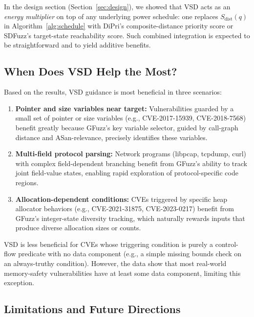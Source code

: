 \documentclass[preprint,12pt,3p]{elsarticle}
\begin{document}
In the design section (Section~\ref{sec:design}), we showed that VSD acts
as an \emph{energy multiplier} on top of any underlying power schedule:
one replaces $S_{\text{dist}}(q)$ in Algorithm~\ref{alg:schedule} with
DiPri's composite-distance priority score or SDFuzz's target-state
reachability score.  Such combined integration is expected to be
straightforward and to yield additive benefits.

\subsection{When Does VSD Help the Most?}

Based on the results, VSD guidance is most beneficial in three scenarios:

\begin{enumerate}
  \item \textbf{Pointer and size variables near target:} Vulnerabilities
    guarded by a small set of pointer or size variables (e.g.,
    CVE-2017-15939, CVE-2018-7568) benefit greatly because GFuzz's key
    variable selector, guided by call-graph distance and ASan-relevance,
    precisely identifies these variables.

  \item \textbf{Multi-field protocol parsing:} Network programs (libpcap,
    tcpdump, curl) with complex field-dependent branching benefit from
    GFuzz's ability to track joint field-value states, enabling rapid
    exploration of protocol-specific code regions.

  \item \textbf{Allocation-dependent conditions:} CVEs triggered by
    specific heap allocator behaviors (e.g., CVE-2021-31875, CVE-2023-0217)
    benefit from GFuzz's integer-state diversity tracking, which naturally
    rewards inputs that produce diverse allocation sizes or counts.
\end{enumerate}

VSD is less beneficial for CVEs whose triggering condition is purely a
control-flow predicate with no data component (e.g., a simple missing
bounds check on an always-truthy condition).  However, the data show
that most real-world memory-safety vulnerabilities have at least some
data component, limiting this exception.

\subsection{Limitations and Future Directions}
\end{document}
